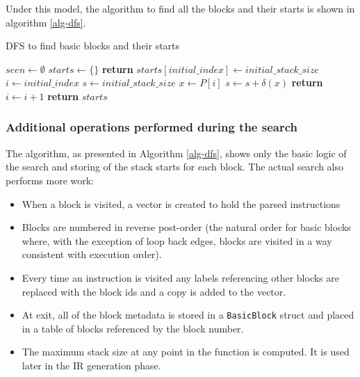 Under this model, the algorithm to find all the blocks and their starts is shown in algorithm
\ref{alg-dfs}.

\begin{algorithm}
      \caption{DFS to find basic blocks and their starts}\label{alg-dfs}
      \begin{algorithmic}[1]
            \State $seen \gets \emptyset$
            \State $starts \gets \{\}$
            \State \textbf{return}
            \EndIf
            \State $starts[initial\_index] \gets initial\_stack\_size$
            \State $i \gets initial\_index$
            \State $s \gets initial\_stack\_size$
            \Repeat
            \State $x \gets P[i]$
            \State $s \gets s + \delta(x)$
            \State {}
            \EndFor
            \State {}
            \EndIf
            \State \textbf{return}
            \EndIf
            \State $i \gets i + 1$
            \EndFunction
            \State {}
            \State \textbf{return} $starts$
            \EndFunction
      \end{algorithmic}
\end{algorithm}

\subsubsection{Additional operations performed during the search} \label{addop}

The algorithm, as presented in Algorithm \ref{alg-dfs}, shows only the basic logic of the search
and
storing of the stack starts for each block. The actual search also performs more work:

\begin{itemize}
      \item When a block is visited, a vector is created to hold the parsed instructions
      \item Blocks are numbered in reverse post-order (the natural order for basic blocks where,
            with the exception of loop back edges, blocks are visited in a way consistent with
            execution order).
      \item Every time an instruction is visited any labels referencing other blocks are replaced
            with the block ids and a copy is added to the vector.
      \item At exit, all of the block metadata is stored in a \texttt{BasicBlock} struct and placed
            in a table of blocks referenced by the block number.
      \item The maximum stack size at any point in the function is computed. It is used later in
            the IR generation phase.
\end{itemize}

